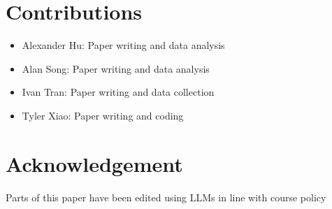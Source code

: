 \documentclass[11pt]{article}
\begin{document}
\section*{Contributions}
\begin{itemize}
    \item Alexander Hu: Paper writing and data analysis
    \item Alan Song: Paper writing and data analysis
    \item Ivan Tran: Paper writing and data collection
    \item Tyler Xiao: Paper writing and coding
\end{itemize}

\section*{Acknowledgement}
Parts of this paper have been edited using LLMs in line with course policy

%


\end{document}
